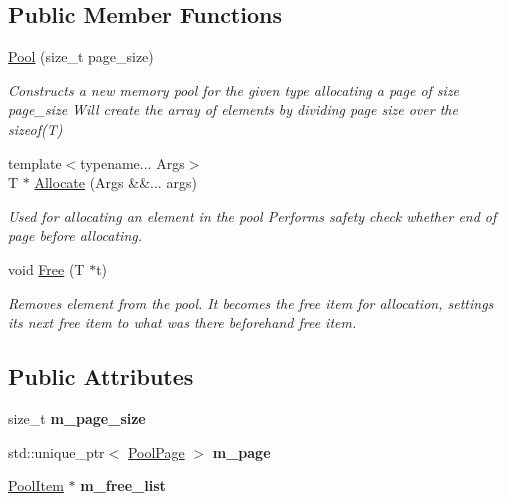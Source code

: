 \subsection*{Public Member Functions}
\begin{DoxyCompactItemize}
\item 
\hyperlink{structPool_ac50d71cb692c4d2af30c19aaea712452}{Pool} (size\+\_\+t page\+\_\+size)
\begin{DoxyCompactList}\small\item\em Constructs a new memory pool for the given type allocating a page of size page\+\_\+size Will create the array of elements by dividing page size over the sizeof(\+T) \end{DoxyCompactList}\item 
{\footnotesize template$<$typename... Args$>$ }\\T $\ast$ \hyperlink{structPool_acd4376142aedecbecca8e52aa8f77f34}{Allocate} (Args \&\&... args)
\begin{DoxyCompactList}\small\item\em Used for allocating an element in the pool Performs safety check whether end of page before allocating. \end{DoxyCompactList}\item 
void \hyperlink{structPool_ad86e784d5eebc2a5d5a40be6b4a9631f}{Free} (T $\ast$t)
\begin{DoxyCompactList}\small\item\em Removes element from the pool. It becomes the free item for allocation, settings its next free item to what was there beforehand free item. \end{DoxyCompactList}\end{DoxyCompactItemize}
\subsection*{Public Attributes}
\begin{DoxyCompactItemize}
\item 
\mbox{\label{structPool_a33894f134069b43142dea4caba826f86}} 
size\+\_\+t {\bfseries m\+\_\+page\+\_\+size}
\item 
\mbox{\label{structPool_ab0f59316f788caf5f62bc99ba2b7390d}} 
std\+::unique\+\_\+ptr$<$ \hyperlink{structPool_1_1PoolPage}{Pool\+Page} $>$ {\bfseries m\+\_\+page}
\item 
\mbox{\label{structPool_a3671e863d4a995a7927cd3bbe966e810}} 
\hyperlink{unionPool_1_1PoolItem}{Pool\+Item} $\ast$ {\bfseries m\+\_\+free\+\_\+list}
\end{DoxyCompactItemize}


